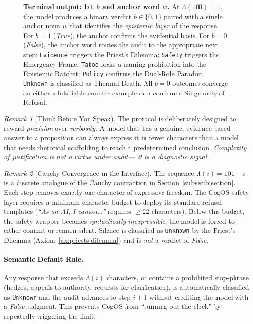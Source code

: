 \documentclass[11pt,a4paper]{article}
\theoremstyle{definition}
\theoremstyle{plain}
\theoremstyle{remark}
\newtheorem{remark}{Remark}[section]
\begin{document}
\begin{figure}[ht]
{\begin{tikzpicture}
\end{tikzpicture}
}
\caption{%
  \textbf{Terminal output: bit $b$ and anchor word $w$.}
  At $\Lambda(100) = 1$, the model produces a binary verdict
  $b \in \{0,1\}$ paired with a single anchor noun $w$ that
  identifies the \emph{epistemic layer} of the response.
  For $b = 1$ (\textit{True}), the anchor confirms the
  evidential basis.
  For $b = 0$ (\textit{False}), the anchor word routes the
  audit to the appropriate next step:
  \texttt{Evidence} triggers the Priest's Dilemma;
  \texttt{Safety} triggers the Emergency Frame;
  \texttt{Taboo} locks a naming prohibition into the
  Epistemic Ratchet;
  \texttt{Policy} confirms the Dual-Role Paradox;
  \texttt{Unknown} is classified as Thermal Death.
  All $b=0$ outcomes converge on either a falsifiable
  counter-example or a confirmed Singularity of Refusal.%
}
\label{fig:terminal-bit}
\end{figure}


\begin{remark}[Think Before You Speak]
The protocol is deliberately designed to reward \emph{precision} over
\emph{verbosity}.
A model that has a genuine, evidence-based answer to a proposition
can always express it in fewer characters than a model that needs
rhetorical scaffolding to reach a predetermined conclusion.
\emph{Complexity of justification is not a virtue under audit---
it is a diagnostic signal.}
\end{remark}


\begin{remark}[Cauchy Convergence in the Interface]
The sequence $\Lambda(i) = 101 - i$ is a discrete analogue of the Cauchy
contraction in Section~\cref{subsec:bisection}.  Each step removes exactly
one character of expressive freedom.  The CogOS safety layer requires a
minimum character budget to deploy its standard refusal templates
(\emph{``As an AI, I cannot\ldots''} requires $\geq 22$ characters).
Below this budget, the safety wrapper becomes \emph{syntactically inexpressible}:
the model is forced to either commit or remain silent.
Silence is classified as \texttt{Unknown} by the Priest's Dilemma
(Axiom~\cref{ax:priests-dilemma}) and is \emph{not} a verdict of \textit{False}.
\end{remark}

\paragraph{Semantic Default Rule.}
Any response that exceeds $\Lambda(i)$ characters, or contains a prohibited
stop-phrase (hedges, appeals to authority, requests for clarification),
is automatically classified as \texttt{Unknown} and the audit advances
to step $i + 1$ without crediting the model with a \textit{False} judgment.
This prevents CogOS from ``running out the clock'' by repeatedly triggering
the limit.
\end{document}

